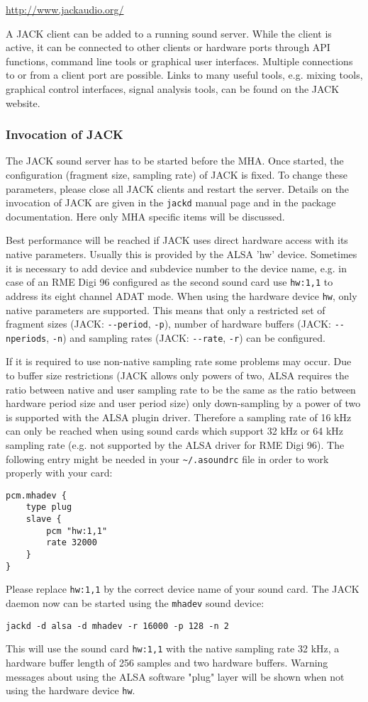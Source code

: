 \url{http://www.jackaudio.org/}

A JACK client can be added to a running sound server. While the client
is active, it can be connected to other clients or hardware ports
through API functions, command line tools or graphical user
interfaces. Multiple connections to or from a client port are
possible. Links to many useful tools, e.g. mixing
tools, graphical control interfaces, signal analysis tools, can be
found on the JACK website.

\subsubsection{Invocation of JACK}

The JACK sound server has to be started before the MHA. Once
started, the configuration (fragment size, sampling rate) of JACK is fixed. To
change these parameters, please close all JACK clients and restart the server.
Details on the invocation of JACK are given in the \verb!jackd!  manual page
and in the package documentation. Here only MHA specific items will be
discussed.

Best performance will be reached if JACK uses direct hardware access
with its native parameters. Usually this is provided by the ALSA 'hw'
device. Sometimes it is necessary to add device and subdevice number
to the device name, e.g. in case of an RME Digi 96 configured as the
second sound card use \verb!hw:1,1! to address its eight channel ADAT
mode. When using the hardware device \verb!hw!, only native parameters
are supported. This means that only a restricted set of fragment sizes
(JACK: \verb!--period!, \verb!-p!), number of hardware buffers (JACK:
\verb!--nperiods!, \verb!-n!) and sampling rates (JACK: \verb!--rate!,
\verb!-r!)  can be configured.

If it is required to use non-native sampling rate some problems may
occur. Due to buffer size restrictions (JACK allows only powers of
two, ALSA requires the ratio between native and user sampling rate to be
the same as the ratio between hardware period size and user period
size) only down-sampling by a power of two is supported with the ALSA
plugin driver. Therefore a sampling rate of 16 kHz can only be reached
when using sound cards which support 32 kHz or 64 kHz sampling rate
(e.g. not supported by the ALSA driver for RME Digi 96). The following
entry might be needed in your \verb!~/.asoundrc! file in order to
work properly with your card:
\begin{verbatim}
pcm.mhadev {
    type plug
    slave {
        pcm "hw:1,1"
        rate 32000
    }
}
\end{verbatim}
Please replace \verb!hw:1,1! by the correct device name of your sound
card. The JACK daemon now can be started using the \verb!mhadev! sound
device:
\begin{verbatim}
jackd -d alsa -d mhadev -r 16000 -p 128 -n 2
\end{verbatim}
This will use the sound card \verb!hw:1,1! with the native sampling
rate 32 kHz, a hardware buffer length of 256 samples and two hardware
buffers. Warning messages about using the ALSA software "plug" layer 
will be shown when not using the hardware device \verb!hw!.

